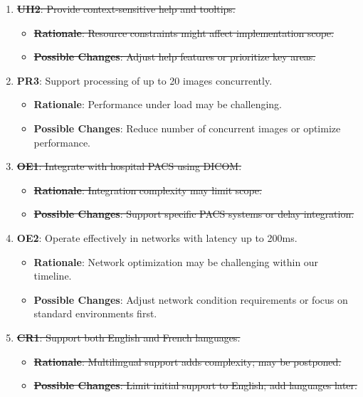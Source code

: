 \documentclass[12pt]{article}
\begin{document}
\begin{enumerate}[resume]
    \item \sout{\textbf{UH2}: Provide context-sensitive help and tooltips.}
    \begin{itemize}[label=-]
        \item \sout{\textbf{Rationale}: Resource constraints might affect implementation scope.}
        \item \sout{\textbf{Possible Changes}: Adjust help features or prioritize key areas.}
    \end{itemize}

    \item \textbf{PR3}: Support processing of up to 20 images concurrently.
    \begin{itemize}[label=-]
        \item \textbf{Rationale}: Performance under load may be challenging.
        \item \textbf{Possible Changes}: Reduce number of concurrent images or optimize performance.
    \end{itemize}

    \item \sout{\textbf{OE1}: Integrate with hospital PACS using DICOM.}
    \begin{itemize}[label=-]
        \item \sout{\textbf{Rationale}: Integration complexity may limit scope.}
        \item \sout{\textbf{Possible Changes}: Support specific PACS systems or delay integration.}
    \end{itemize}

    \item \textbf{OE2}: Operate effectively in networks with latency up to 200ms.
    \begin{itemize}[label=-]
        \item \textbf{Rationale}: Network optimization may be challenging within our timeline.
        \item \textbf{Possible Changes}: Adjust network condition requirements or focus on standard environments first.
    \end{itemize}

    \item \sout{\textbf{CR1}: Support both English and French languages.}
    \begin{itemize}[label=-]
        \item \sout{\textbf{Rationale}: Multilingual support adds complexity; may be postponed.}
        \item \sout{\textbf{Possible Changes}: Limit initial support to English; add languages later.}
    \end{itemize}
\end{enumerate}
\end{document}
